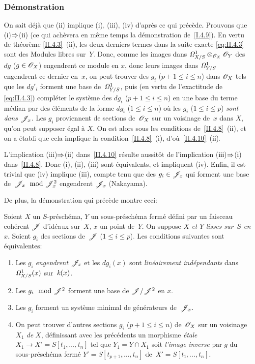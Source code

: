 \subsubsection*{D\'emonstration}
On
sait d\'ej\`a que (ii) implique (i), (iii), (iv) d'apr\`es ce qui
pr\'ec\`ede. Prouvons que (i)$\To$(ii) (ce qui
ach\`evera en m\^eme temps la d\'emonstration
de~\ref{I.4.9}).
En vertu de th\'eor\`eme \ref{II.4.3}~(ii), les deux derniers
termes dans la suite exacte \eqref{eq:II.4.3} sont des Modules libres
sur~$Y$. Donc, comme les images dans
$\it{\Omega}^1_{X/S}\otimes_{\cal{O}_X} \cal{O}_Y$ des $dg$ ($g \in
\cal{O}_X$) engendrent ce module en $x$, donc leurs images dans
$\it{\Omega}^1_{Y/S}$ engendrent ce dernier en~$x$, on peut trouver
des $g_i$ ($p+1 \leq i \leq n$) dans $\cal{O}_X$ tels que les $dg'_i$
forment une base de~$\it{\Omega}^1_{Y/S}$, puis (en vertu de
l'exactitude de \eqref{eq:II.4.3}) compl\'eter le syst\`eme des
$dg_i$ ($p+1 \leq i \leq n$) en une base du terme m\'edian par des
\'el\'ements de la forme $dg_i$ ($1 \leq i \leq n$) o\`u les
$g_i$ ($1 \leq i \leq p$) \emph{sont dans $\cal{J}_x$.} Les $g_i$
proviennent de sections de~$\cal{O}_X$ sur un voisinage de~$x$ dans
$X$, qu'on peut supposer \'egal \`a $X$. On est alors sous les
conditions de~\ref{II.4.8}~(ii), et on a \'etabli que cela implique
la condition~\ref{II.4.8}~(i), d'o\`u~\ref{II.4.10}~(ii).

L'implication (iii)$\To$(ii) dans~\ref{II.4.10} r\'esulte
aussit\^ot de l'implication (iii)$\To$(i)
dans~\ref{II.4.8}. Donc
(i), (ii), (iii)
sont \'equivalents, et
impliquent (iv). Enfin, il est trivial que (iv) implique (iii), compte
tenu que des $g_i \in \cal{J}_x$ qui forment une base de~$\cal{J}_x
\mod \cal{J}_x^2$ engendrent $\cal{J}_x$ (Nakayama).

De plus, la d\'emonstration qui pr\'ec\`ede montre ceci:
\begin{corollaire}
\label{II.4.11}
Soient $X$ un $S$-pr\'esch\'ema, $Y$ un sous-pr\'esch\'ema
ferm\'e d\'efini par un faisceau coh\'erent $\cal{J}$
d'id\'eaux sur~$X$, $x$ un point de~$Y$. On suppose \emph{$X$ et $Y$
lisses sur~$S$ en $x$}. Soient $g_i$ des sections de~$\cal{J}$ ($1
\leq i \leq p$). Les conditions suivantes sont \'equivalentes:
\begin{enumerate}
\item[(i)] Les $g_i$ \emph{engendrent} $\cal{J}_x$ et les $dg_i(x)$
sont \emph{linéairement indépendants} dans
$\it{\Omega}^1_{X/S}(x)$
sur~$\kres(x)$.
\item[(ii)] Les $g_i \mod \cal{J}^2$ forment une base de
$\cal{J}/\cal{J}^2$ en $x$.
\item[(iii)] Les $g_i$ forment un syst\`eme minimal de
g\'en\'erateurs de~$\cal{J}_x$.
\item[(iv)] On peut trouver d'autres sections $g_i$ ($p+1 \leq i \leq
n$) de~$\cal{O}_X$ sur un voisinage $X_1$ \emph{de} $X$,
d\'efinissant avec les pr\'ec\'edents un morphisme
\emph{étale} $X_1 \to X'=S[t_1,\dots,t_n]$ tel que $Y_1=Y \cap
X_1$ soit \emph{l'image inverse} par $g$ du sous-pr\'esch\'ema
ferm\'e $Y'=S[t_{p+1},\dots,t_n]$ de~$X'=S[t_{1},\dots,t_n]$.
\end{enumerate}
\end{corollaire}

